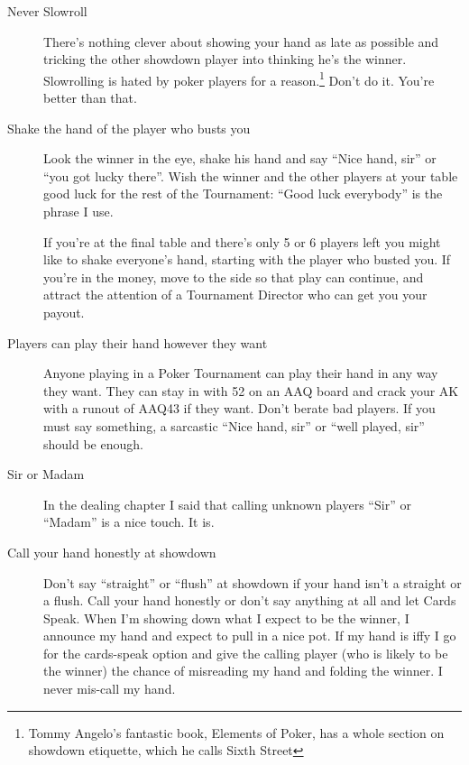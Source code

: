\begin{description}

\item[Never Slowroll]  There's nothing clever about showing your hand
as late as possible and tricking the other showdown player into thinking
he's the winner. Slowrolling is hated by poker players for a
reason.\footnote{Tommy Angelo's fantastic book, Elements of Poker, has
a whole section on showdown etiquette, which he calls Sixth Street}
Don't do it. You're better than that.


\item[Shake the hand of the player who busts you] Look the winner in the
eye, shake his hand and say ``Nice hand, sir'' or ``you got lucky there''.
Wish the winner and the other players at your table good luck for the
rest of the Tournament: ``Good luck everybody'' is the phrase I use.

If you're at the final table and there's only 5 or 6 players left you
might like to shake everyone's hand, starting with the player who
busted you. If you're in the money, move to the side so that play
can continue, and attract the attention of a Tournament Director who
can get you your payout.

\item[Players can play their hand however they want] Anyone playing in
a Poker Tournament can play their hand in any way they want. They
can stay in with 52 on an AAQ board and crack your AK with a runout
of AAQ43 if they want. Don't berate bad players. If you must say
something, a sarcastic ``Nice hand, sir'' or ``well played, sir'' should
be enough.

\item[Sir or Madam] In the dealing chapter I said that calling
unknown players ``Sir'' or ``Madam'' is a nice touch. It is.

\item[Call your hand honestly at showdown] Don't say ``straight''
or ``flush'' at showdown if your hand isn't a straight or a flush.
Call your hand honestly or don't say anything at all and let
Cards Speak. When I'm showing down what I expect to be the winner,
I announce my hand and expect to pull in a nice pot. If my hand is
iffy I go for the cards-speak option and give the calling player (who
is likely to be the winner) the chance of misreading my hand and
folding the winner. I never mis-call my hand.

\end{description}
